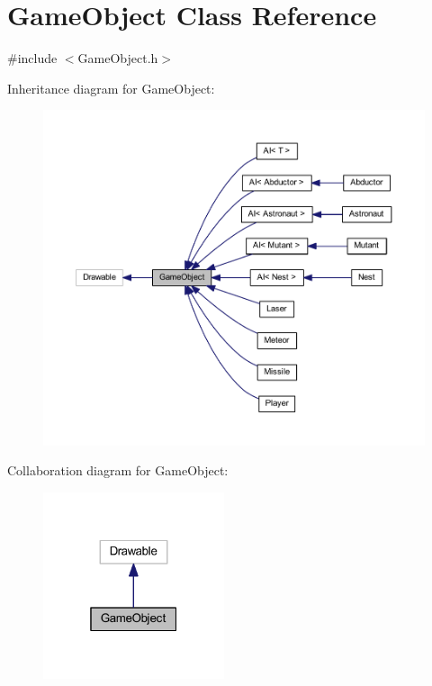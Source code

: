 \hypertarget{class_game_object}{}\section{Game\+Object Class Reference}
\label{class_game_object}


{\ttfamily \#include $<$Game\+Object.\+h$>$}



Inheritance diagram for Game\+Object\+:
\nopagebreak
\begin{figure}[H]
\begin{center}
\leavevmode
\includegraphics[width=350pt]{class_game_object__inherit__graph}
\end{center}
\end{figure}


Collaboration diagram for Game\+Object\+:
\nopagebreak
\begin{figure}[H]
\begin{center}
\leavevmode
\includegraphics[width=151pt]{class_game_object__coll__graph}
\end{center}
\end{figure}
